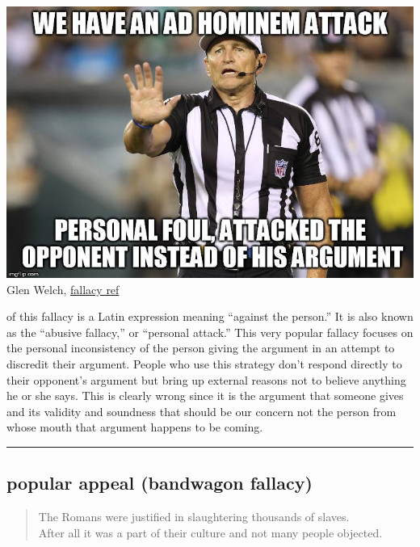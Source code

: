 \documentclass[justified]{tufte-book}
\newenvironment{argument}{\begin{quote}\normalsize}{\end{quote}}
\begin{document}
\begin{marginfigure}
\includegraphics{img/fallacies/ad-hominem.jpg}\\
Glen Welch, \href{https://twitter.com/fallacy_ref?lang=en}{fallacy ref}
\end{marginfigure}

 of this fallacy is a Latin expression meaning ``against the person.'' It is also known as the ``abusive fallacy,'' or ``personal attack.'' This very popular fallacy focuses on the personal inconsistency of the person giving the argument in an attempt to discredit their argument. People who use this strategy don't respond directly to their opponent's argument but bring up external reasons not to believe anything he or she says. This is clearly wrong since it is the argument that someone gives and its validity and soundness that should be our concern not the person from whose mouth that argument happens to be coming.

\begin{center}\rule{0.5\linewidth}{\linethickness}\end{center}

\hypertarget{popular-appeal-bandwagon-fallacy}{%
\subsection*{popular appeal (bandwagon fallacy)}\label{popular-appeal-bandwagon-fallacy}}

\begin{argument}
The Romans were justified in slaughtering thousands of slaves.\\
After all it was a part of their culture and not many people objected.
\end{argument}
\end{document}
